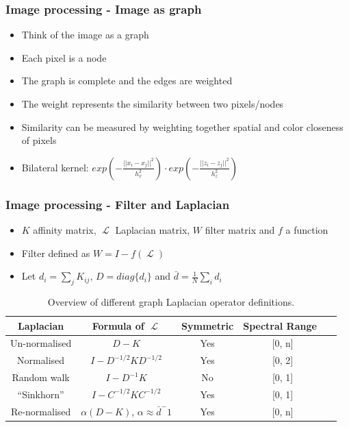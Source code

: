 \documentclass{beamer}
\DeclareMathOperator{\Lapl}{\mathcal{L}}
\begin{document}
\begin{frame}
 \frametitle{Image processing - Image as graph}
 \begin{itemize}
  \item Think of the image as a graph
  \item Each pixel is a node
  \item The graph is complete and the edges are weighted
  \item The weight represents the similarity between two pixels/nodes
  \item Similarity can be measured by weighting together spatial and color closeness of pixels
  \item Bilateral kernel: \(exp(-\frac{||x_i - x_j||^2}{h_x^2}) \cdot exp(-\frac{||z_i - z_j||^2}{h_z^2})\)
 \end{itemize}
\end{frame}

\begin{frame}
 \frametitle{Image processing - Filter and Laplacian}
 \begin{itemize}
  \item \(K\) affinity matrix, \(\Lapl\) Laplacian matrix, \(W\) filter matrix and \(f\) a function
  \item Filter defined as \(W = I - f(\Lapl)\)
  \item Let \(d_i = \sum_j K_{ij}\), \(D = diag\{d_i\}\) and \(\bar{d} = \frac{1}{N} \sum_i d_i\)
 \end{itemize}
 \begin{table}
  \centering
  \begin{tabular}{|c|c|c|c|c|}
   \hline
   Laplacian & Formula of \(\Lapl\) & Symmetric & Spectral Range \\
   \hline
   Un-normalised & \(D - K\) & Yes & [0, n] \\
   \hline
   Normalised & \(I - D^{-1/2}KD^{-1/2}\) & Yes & [0, 2] \\
   \hline
   Random walk & \(I - D^{-1}K\) & No & [0, 1] \\
   \hline
   ``Sinkhorn'' & \(I - C^{-1/2}KC^{-1/2}\) & Yes & [0, 1] \\
   \hline
   Re-normalised & \(\alpha(D - K)\), \(\alpha \approx \bar{d}^-1\) & Yes & [0, n] \\
   \hline
  \end{tabular}
  \caption{Overview of different graph Laplacian operator definitions.}
 \end{table}
\end{frame}
\end{document}

